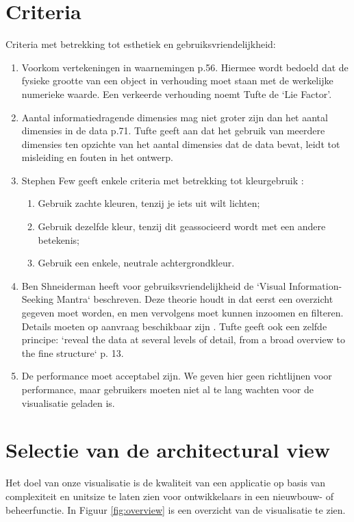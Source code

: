 \documentclass[a4paper]{article}
\begin{document}
\section{Criteria} \label{Criteria}
Criteria met betrekking tot esthetiek en gebruiksvriendelijkheid:
\begin{enumerate}
\item Voorkom vertekeningen in waarnemingen \cite{tufte2014visual} p.56. Hiermee wordt bedoeld dat de fysieke grootte van een object in verhouding moet staan met de werkelijke numerieke waarde. Een verkeerde verhouding noemt Tufte de `Lie Factor'.
\item Aantal informatiedragende dimensies mag niet groter zijn dan het aantal dimensies in de data \cite{tufte2014visual} p.71. Tufte geeft aan dat het gebruik van meerdere dimensies ten opzichte van het aantal dimensies dat de data bevat, leidt tot misleiding en fouten in het ontwerp.

\item Stephen Few geeft enkele criteria met betrekking tot kleurgebruik \cite{B}:
\begin{enumerate}
\item Gebruik zachte kleuren, tenzij je iets uit wilt lichten;
\item Gebruik dezelfde kleur, tenzij dit geassocieerd wordt met een andere betekenis; 
\item Gebruik een enkele, neutrale achtergrondkleur.
\end{enumerate}

\item Ben Shneiderman heeft voor gebruiksvriendelijkheid de `Visual Information-Seeking Mantra` beschreven. Deze theorie houdt in dat eerst een overzicht gegeven moet worden, en men vervolgens moet kunnen inzoomen en filteren. Details moeten op aanvraag beschikbaar zijn \cite{A}. Tufte geeft ook een zelfde principe: `reveal the data at several levels of detail, from a broad overview to the fine structure` \cite{tufte2014visual} p. 13.

\item De performance moet acceptabel zijn. We geven hier geen richtlijnen voor performance, maar gebruikers moeten niet al te lang wachten voor de visualisatie geladen is.
\end{enumerate}


\section{Selectie van de architectural view}
Het doel van onze visualisatie is de kwaliteit van een applicatie op basis van complexiteit en unitsize te laten zien voor ontwikkelaars in een nieuwbouw- of beheerfunctie. In Figuur \ref{fig:overview} is een overzicht van de visualisatie te zien.
\end{document}
